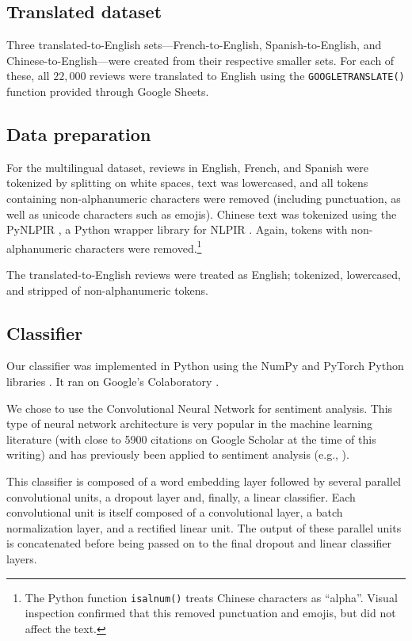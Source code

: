 \documentclass[11pt,a4paper]{article}
\begin{document}
\subsection{Translated dataset}
    Three translated-to-English sets---French-to-English, Spanish-to-English, and Chinese-to-English---were created from their respective smaller sets. For each of these, all $22,000$ reviews were translated to English using the \texttt{GOOGLETRANSLATE()} function \cite{GoogleTranslate} provided through Google Sheets.
    
\subsection{Data preparation}
    For the multilingual dataset, reviews in English, French, and Spanish were tokenized by splitting on white spaces, text was lowercased, and all tokens containing non-alphanumeric characters were removed (including punctuation, as well as unicode characters such as emojis). Chinese text was tokenized using the PyNLPIR \cite{pynlpir}, a Python wrapper library for NLPIR \cite{zhou2003nlpir}. Again, tokens with non-alphanumeric characters were removed.\footnote{The Python function \texttt{isalnum()} treats Chinese characters as ``alpha''. Visual inspection confirmed that this removed punctuation and emojis, but did not affect the text.}
    
    The translated-to-English reviews were treated as English; tokenized, lowercased, and stripped of non-alphanumeric tokens.

\subsection{Classifier}
    Our classifier was implemented in Python \cite{python3} using the NumPy \cite{numpy} and PyTorch Python libraries \cite{pytorch}. It ran on Google's Colaboratory \cite{Colab}.

    We chose to use the \citet{kim2014convolutional} Convolutional Neural Network for sentiment analysis. This type of neural network architecture is very popular in the machine learning literature (with close to 5900 citations on Google Scholar at the time of this writing) and has previously been applied to sentiment analysis (e.g., \citealp{severyn2015twitter, cai2015convolutional}).
    
    This classifier is composed of a word embedding layer followed by several parallel convolutional units, a dropout layer and, finally, a linear classifier. Each convolutional unit is itself composed of a convolutional layer, a batch normalization layer, and a rectified linear unit. The output of these parallel units is concatenated before being passed on to the final dropout and linear classifier layers.
    
\end{document}
